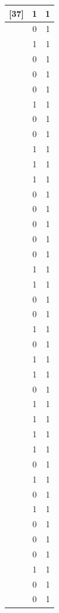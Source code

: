 \documentclass{article}
\begin{document}
\begin{center}
\begin{tabular}{c|c|c}
  [37]	&	1 & 1 \\ \hline
  [38]	&	0 & 1 \\ \hline
  [39]	&	1 & 1 \\ \hline
  [40]	&	0 & 1 \\ \hline
  [41]	&	0 & 1 \\ \hline
  [42]	&	0 & 1 \\ \hline
  [43]	&	1 & 1 \\ \hline
  [44]	&	0 & 1 \\ \hline
  [45]	&	0 & 1 \\ \hline
  [46]	&	1 & 1 \\ \hline
  [47]	&	1 & 1 \\ \hline
  [48]	&	1 & 1 \\ \hline
  [49]	&	0 & 1 \\ \hline
  [50]	&	0 & 1 \\ \hline
  [51]	&	0 & 1 \\ \hline
  [52]	&	0 & 1 \\ \hline
  [53]	&	0 & 1 \\ \hline
  [54]	&	1 & 1 \\ \hline
  [55]	&	1 & 1 \\ \hline
  [56]	&	0 & 1 \\ \hline
  [57]	&	0 & 1 \\ \hline
  [58]	&	1 & 1 \\ \hline
  [59]	&	0 & 1 \\ \hline
  [60]	&	1 & 1 \\ \hline
  [61]	&	1 & 1 \\ \hline
  [62]	&	0 & 1 \\ \hline
  [63]	&	1 & 1 \\ \hline
  [64]	&	1 & 1 \\ \hline
  [65]	&	1 & 1 \\ \hline
  [66]	&	1 & 1 \\ \hline
  [67]	&	0 & 1 \\ \hline
  [68]	&	1 & 1 \\ \hline
  [69]	&	0 & 1 \\ \hline
  [70]	&	1 & 1 \\ \hline
  [71]	&	0 & 1 \\ \hline
  [72]	&	0 & 1 \\ \hline
  [73]	&	0 & 1 \\ \hline
  [74]	&	1 & 1 \\ \hline
  [75]	&	0 & 1 \\ \hline
  [76]	&	0 & 1 \\ \hline

\end{tabular}
\end{center}
\end{document}
